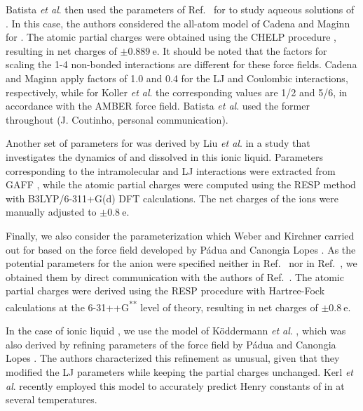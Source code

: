 \documentclass[3p,twocolumn]{elsarticle}
\begin{document}
Batista \textit{et al}. \cite{Batista_2015} then used the parameters of Ref.~ for \ce{[B(CN)_4]^-} to study aqueous solutions of \ce{[emim][B(CN)_4]}.
In this case, the authors considered the all-atom model of Cadena and Maginn \cite{Cadena_2006} for \ce{[emim]^+}.
The atomic partial charges were obtained using the CHELP procedure \cite{Breneman_1990}, resulting in net charges of $\pm 0.889~\mathrm{e}$.
It should be noted that the factors for scaling the 1-4 non-bonded interactions are different for these force fields.
Cadena and Maginn \cite{Cadena_2006} apply factors of 1.0 and 0.4 for the LJ and Coulombic interactions, respectively, while for Koller \textit{et al}. \cite{Koller_2012} the corresponding values are 1/2 and 5/6, in accordance with the AMBER force field.
Batista \textit{et al}. \cite{Batista_2015} used the former throughout (J. Coutinho, personal communication).

Another set of parameters for \ce{[emim][B(CN)_4]} was derived by Liu \textit{et al}. \cite{Liu_2014} in a study that investigates the dynamics of  and  dissolved in this ionic liquid.
Parameters corresponding to the intramolecular and LJ interactions were extracted from GAFF \cite{Wang_2004}, while the atomic partial charges were computed using the RESP method \cite{Bayly_1993} with B3LYP/6-311+G(d) DFT calculations.
The net charges of the ions were manually adjusted to $\pm 0.8 ~\mathrm{e}$.

Finally, we also consider the parameterization which Weber and Kirchner \cite{Weber_2016} carried out for \ce{[emim][B(CN)_4]} based on the force field developed by P{\'{a}}dua and Canongia Lopes \cite{Canongia_Lopes_2006}.
As the potential parameters for the anion were specified neither in Ref.~ nor in Ref.~, we obtained them by direct communication with the authors of Ref.~.
The atomic partial charges were derived using the RESP procedure with Hartree-Fock calculations at the \mbox{6-31++G\textsuperscript{**}} level of theory, resulting in net charges of $\pm 0.8 ~\mathrm{e}$.

In the case of ionic liquid \ce{[emim][NTf_2]}, we use the model of K\"{o}ddermann \textit{et al}. \cite{Koddermann_2007}, which was also derived by refining parameters of the force field by P{\'{a}}dua and Canongia Lopes \cite{Canongia_Lopes_2006}.
The authors characterized this refinement as unusual, given that they modified the LJ parameters while keeping the partial charges unchanged.
Kerl \textit{et al}. \cite{Kerl__2017} recently employed this model to accurately predict Henry constants of  in \ce{[emim][NTf_2]} at several temperatures.
\end{document}
